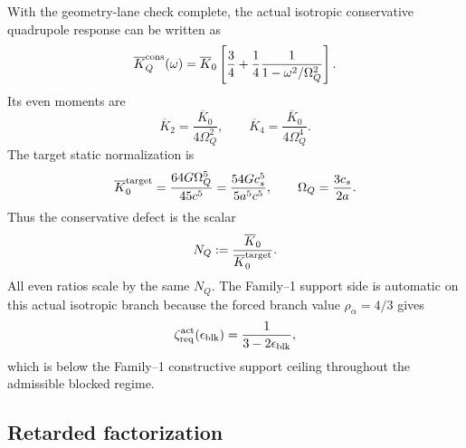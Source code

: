 With the geometry-lane check complete, the actual isotropic conservative quadrupole response can be written as
\begin{equation}
\label{eq:app-part04-kbar-cons}
\overline K_Q^{\rm cons}(\omega)
=
\overline K_0
\left[
\frac34+\frac14\frac{1}{1-\omega^2/\Omega_Q^2}
\right].
\end{equation}
Its even moments are
\begin{equation}
\label{eq:app-part04-kbar-even-moments}
\overline K_2=\frac{\overline K_0}{4\Omega_Q^2},
\qquad
\overline K_4=\frac{\overline K_0}{4\Omega_Q^4}.
\end{equation}
The target static normalization is
\begin{equation}
\label{eq:app-part04-kbar0-target}
\overline K_0^{\rm target}
=
\frac{64G\Omega_Q^5}{45c^5}
=
\frac{54G c_s^5}{5a^5c^5},
\qquad
\Omega_Q=\frac{3c_s}{2a}.
\end{equation}
Thus the conservative defect is the scalar
\begin{equation}
\label{eq:app-part04-NQ-def}
N_Q:=\frac{\overline K_0}{\overline K_0^{\rm target}}.
\end{equation}
All even ratios scale by the same \(N_Q\).  The Family--1 support side is automatic on this actual isotropic branch because the forced branch value \(\rho_\alpha=4/3\) gives
\begin{equation}
\label{eq:app-part04-blocked-zeta-req}
\zeta_{\rm req}^{\rm act}(\epsilon_{\rm blk})
=
\frac{1}{3-2\epsilon_{\rm blk}},
\end{equation}
which is below the Family--1 constructive support ceiling throughout the admissible blocked regime.

\subsection{Retarded factorization}
\label{subsec:app-part04-retarded-factorization}

